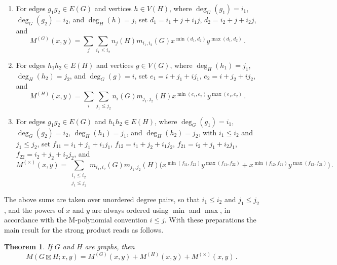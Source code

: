 \documentclass[letterpaper,12pt]{article}
\newtheorem{theorem}{Theorem}[section]
\begin{document}
\begin{enumerate}
\item[(1)] For edges $g_1g_2\in E(G)$ and vertices $h\in V(H)$, where $\deg_G(g_1)=i_1$, $\deg_G(g_2)=i_2$, and $\deg_H(h)=j$, set $d_1 = i_1 + j + i_1j$, $d_2 = i_2 + j + i_2j$, and 
\begin{equation}\label{eq:MPolStrongG}
    M^{(G)}(x,y)
=\sum_{j}
\sum_{i_1\le i_2}
n_j(H)  m_{i_1,i_2}(G) 
x^{\min(d_1,d_2)}  
y^{\max(d_1,d_2)}\,.
\end{equation}
    \item[(2)] For edges $h_1h_2\in E(H)$ and vertices $g\in V(G)$, where $\deg_H(h_1)=j_1$, $\deg_H(h_2)=j_2$, and $\deg_G(g)=i$, set $e_1 = i + j_1 + ij_1$, $e_2 = i + j_2 + ij_2$, and 
\begin{equation}\label{eq:MPolStrongH}
    M^{(H)}(x,y)
=\sum_{i}
\sum_{j_1\le j_2}
n_i(G)  m_{j_1,j_2}(H) 
x^{\min(e_1,e_2)}  
y^{\max(e_1,e_2)}\,.
\end{equation}
\item[(3)] For edges $g_1g_2\in E(G)$ and $h_1h_2\in E(H)$, where $\deg_G(g_1)=i_1$, $\deg_G(g_2)=i_2$, $\deg_H(h_1)=j_1$, and $\deg_H(h_2)=j_2$,  with $i_1\le i_2$ and $j_1\le j_2$, set $f_{11} = i_1 + j_1 + i_1j_1$, $f_{12}  = i_1 + j_2 + i_1j_2$, $f_{21}  = i_2 + j_1 + i_2j_1$, $f_{22}  = i_2 + j_2 + i_2j_2$, and 
\begin{equation}\label{eq:MPolStrongTimes}
M^{(\times)}(x,y)
=
\sum_{\substack{i_1\le i_2 \\ j_1\le j_2}}
m_{i_1,i_2}(G)  m_{j_1,j_2}(H) \Big(
x^{\min(f_{11},f_{22})} y^{\max(f_{11},f_{22})}
+
x^{\min(f_{12},f_{21})} y^{\max(f_{12},f_{21})}
\Big)\,.
\end{equation}
\end{enumerate}
 
The above sums are taken over unordered degree pairs, so that $i_1\le i_2$ and $j_1\le j_2$, and the powers of $x$ and $y$ are always ordered using $\min$ and $\max$, in accordance with the M-polynomial convention $i\le j$. With these preparations the main result for the strong product reads as follows. 

\begin{theorem}
\label{thm:strong}
If $G$ and $H$ are graphs, then 
\begin{equation}\label{eq:MPolStrongAll}
    M(G\boxtimes H;x,y)
=
M^{(G)}(x,y) + M^{(H)}(x,y) + M^{(\times)}(x,y)\,.
\end{equation}
\end{theorem}
\end{document}

